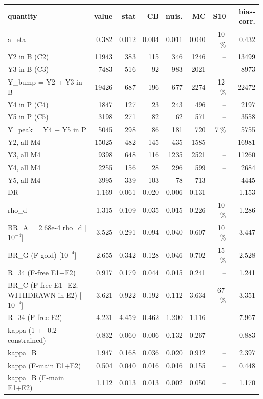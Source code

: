 \begin{tabular}{lrrrrrrr}
\toprule
quantity & value & stat & CB & nuis. & MC & S10 & bias-corr. \\
\midrule
a\_eta & 0.382 & 0.012 & 0.004 & 0.011 & 0.040 & 10\,\% & 0.432 \\
Y2 in B (C2) & 11943 & 383 & 115 & 346 & 1246 & -- & 13499 \\
Y3 in B (C3) & 7483 & 516 & 92 & 983 & 2021 & -- & 8973 \\
Y\_bump = Y2 + Y3 in B & 19426 & 687 & 196 & 677 & 2274 & 12\,\% & 22472 \\
Y4 in P (C4) & 1847 & 127 & 23 & 243 & 496 & -- & 2197 \\
Y5 in P (C5) & 3198 & 271 & 82 & 62 & 571 & -- & 3558 \\
Y\_peak = Y4 + Y5 in P & 5045 & 298 & 86 & 181 & 720 & 7\,\% & 5755 \\
Y2, all M4 & 15025 & 482 & 145 & 435 & 1585 & -- & 16981 \\
Y3, all M4 & 9398 & 648 & 116 & 1235 & 2521 & -- & 11260 \\
Y4, all M4 & 2255 & 156 & 28 & 296 & 599 & -- & 2684 \\
Y5, all M4 & 3995 & 339 & 103 & 78 & 713 & -- & 4445 \\
DR & 1.169 & 0.061 & 0.020 & 0.006 & 0.131 & -- & 1.153 \\
rho\_d & 1.315 & 0.109 & 0.035 & 0.015 & 0.226 & 10\,\% & 1.286 \\
BR\_A = 2.68e-4 rho\_d [$10^{-4}$] & 3.525 & 0.291 & 0.094 & 0.040 & 0.607 & 10\,\% & 3.447 \\
BR\_G (F-gold) [$10^{-4}$] & 2.655 & 0.342 & 0.128 & 0.046 & 0.702 & 15\,\% & 2.528 \\
R\_34 (F-free E1+E2) & 0.917 & 0.179 & 0.044 & 0.015 & 0.241 & -- & 1.241 \\
BR\_C (F-free E1+E2; WITHDRAWN in E2) [$10^{-4}$] & 3.621 & 0.922 & 0.192 & 0.112 & 3.634 & 67\,\% & -3.351 \\
R\_34 (F-free E2) & -4.231 & 4.459 & 0.462 & 1.200 & 1.116 & -- & -7.967 \\
kappa (1 +- 0.2 constrained) & 0.832 & 0.060 & 0.006 & 0.132 & 0.267 & -- & 0.883 \\
kappa\_B & 1.947 & 0.168 & 0.036 & 0.020 & 0.912 & -- & 2.397 \\
kappa (F-main E1+E2) & 0.504 & 0.040 & 0.016 & 0.016 & 0.155 & -- & 0.448 \\
kappa\_B (F-main E1+E2) & 1.112 & 0.013 & 0.013 & 0.002 & 0.050 & -- & 1.170 \\
\bottomrule
\end{tabular}
